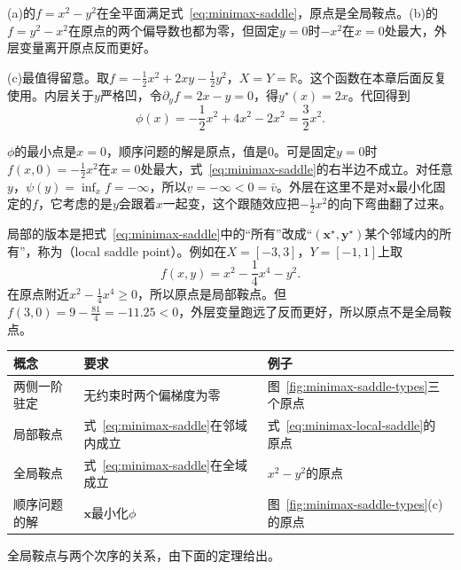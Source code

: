 (a)的$f=x^2-y^2$在全平面满足式~\eqref{eq:minimax-saddle}，原点是全局鞍点。(b)的$f=y^2-x^2$在原点的两个偏导数也都为零，但固定$y=0$时$-x^2$在$x=0$处最大，外层变量离开原点反而更好。

(c)最值得留意。取$f=-\frac12x^2+2xy-\frac12y^2$，$X=Y=\mathbb{R}$。这个函数在本章后面反复使用。内层关于$y$严格凹，令$\partial_yf=2x-y=0$，得$y^\star(x)=2x$。代回得到
\begin{equation}
 \phi(x)=-\frac12x^2+4x^2-2x^2=\frac32x^2.
 \label{eq:minimax-running-phi}
\end{equation}

$\phi$的最小点是$x=0$，顺序问题的解是原点，值是$0$。可是固定$y=0$时$f(x,0)=-\frac12x^2$在$x=0$处最大，式~\eqref{eq:minimax-saddle}的右半边不成立。对任意$y$，$\psi(y)=\inf_xf=-\infty$，所以$\underline{v}=-\infty<0=\bar{v}$。外层在这里不是对$\bm{x}$最小化固定的$f$，它考虑的是$y$会跟着$x$一起变，这个跟随效应把$-\frac12x^2$的向下弯曲翻了过来。

局部的版本是把式~\eqref{eq:minimax-saddle}中的“所有”改成“$(\bm{x}^\star,\bm{y}^\star)$某个邻域内的所有”，称为（local saddle point）。例如在$X=[-3,3]$，$Y=[-1,1]$上取
\begin{equation}
 f(x,y)=x^2-\frac14x^4-y^2.
 \label{eq:minimax-local-saddle}
\end{equation}
在原点附近$x^2-\frac14x^4\geq0$，所以原点是局部鞍点。但$f(3,0)=9-\frac{81}{4}=-11.25<0$，外层变量跑远了反而更好，所以原点不是全局鞍点。

\begin{BookInlineTable}
 \centering
 \begin{tabular}{@{}lll@{}}
  \toprule
  概念 & 要求 & 例子\\
  \midrule
  两侧一阶驻定 & 无约束时两个偏梯度为零 & 图~\ref{fig:minimax-saddle-types}三个原点\\
  局部鞍点 & 式~\eqref{eq:minimax-saddle}在邻域内成立 & 式~\eqref{eq:minimax-local-saddle}的原点\\
  全局鞍点 & 式~\eqref{eq:minimax-saddle}在全域成立 & $x^2-y^2$的原点\\
  顺序问题的解 & $\bm{x}$最小化$\phi$ & 图~\ref{fig:minimax-saddle-types}(c)的原点\\
  \bottomrule
 \end{tabular}
 \caption{四个相近概念的比较。两侧一阶驻定最弱，它不自动解决顺序问题；顺序问题的解也不一定是鞍点。}
 \label{tab:minimax-saddle-compare}
\end{BookInlineTable}

全局鞍点与两个次序的关系，由下面的定理给出。

